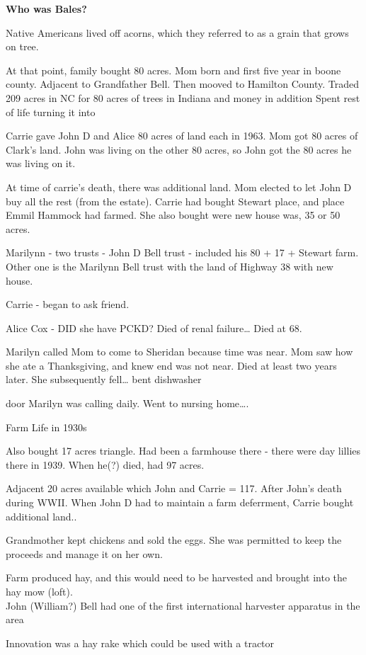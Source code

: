 \documentclass[
]{book}
\begin{document}
\textbf{Who was Bales?}

Native Americans lived off acorns, which they referred to as a grain that grows on tree.

At that point, family bought 80 acres. Mom born and first five year in boone county. Adjacent to Grandfather Bell. Then mooved to Hamilton County. Traded 209 acres in NC for 80 acres of trees in Indiana and money in addition Spent rest of life turning it into

Carrie gave John D and Alice 80 acres of land each in 1963. Mom got 80 acres of Clark's land. John was living on the other 80 acres, so John got the 80 acres he was living on it.

At time of carrie's death, there was additional land. Mom elected to let John D buy all the rest (from the estate). Carrie had bought Stewart place, and place Emmil Hammock had farmed. She also bought were new house was, 35 or 50 acres.

Marilynn - two trusts - John D Bell trust - included his 80 + 17 + Stewart farm. Other one is the Marilynn Bell trust with the land of Highway 38 with new house.

Carrie - began to ask friend.

Alice Cox - DID she have PCKD? Died of renal failure\ldots{} Died at 68.

Marilyn called Mom to come to Sheridan because time was near. Mom saw how she ate a Thanksgiving, and knew end was not near. Died at least two years later. She subsequently fell\ldots{} bent dishwasher

door Marilyn was calling daily. Went to nursing home\ldots.

Farm Life in 1930s

Also bought 17 acres triangle. Had been a farmhouse there - there were day lillies there in 1939. When he(?) died, had 97 acres.

Adjacent 20 acres available which John and Carrie = 117. After John's death during WWII. When John D had to maintain a farm deferrment, Carrie bought additional land..

Grandmother kept chickens and sold the eggs. She was permitted to keep the proceeds and manage it on her own.

Farm produced hay, and this would need to be harvested and brought into the hay mow (loft).\\
John (William?) Bell had one of the first international harvester apparatus in the area

Innovation was a hay rake which could be used with a tractor
\end{document}
